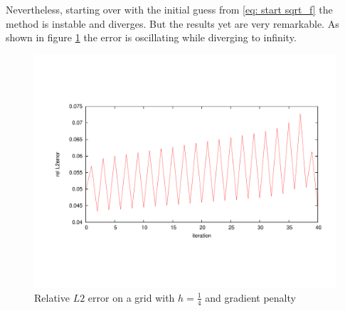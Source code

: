 Nevertheless, starting over with the initial guess from \eqref{eq: start sqrt_f} the method is instable and diverges. But the results yet are very remarkable. As shown in figure \ref{fig: oscillation} the error is oscillating while diverging  to infinity.
\begin{figure}[h]
	\centering
	\includegraphics[trim = 2cm 4cm 1cm 4cm, width=1\textwidth]{plots/oscillation.pdf}
	\caption{Relative $L2$ error on a grid with $h=\frac 1 4$ and gradient penalty}
	\label{fig: oscillation}
\end{figure}

